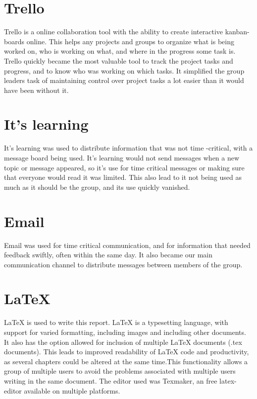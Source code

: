 \section{Trello}  
\label{def:trello} 
Trello is a online collaboration tool with the ability to create interactive kanban-boards online. This helps any projects and groups to organize what is being worked on, who is working on what, and where in the progress some task is. Trello quickly became the most valuable tool to track the project tasks and progress, and to know who was working on which tasks. It simplified the group leaders task of maintaining control over project tasks a lot easier than it would have been without it.

\section{It's learning}
It's learning was used to distribute information that was not time -critical, with a message board being used. It's learning would not send messages when a new topic or message appeared, so it's use for time critical messages or making sure that everyone would read it was limited. This also lead to it not being used as much as it should be the group, and its use quickly vanished.

\section{Email}
Email was used for time critical communication, and for information that needed feedback swiftly, often within the same day. It also became our main communication channel to distribute messages between members of the group.

\section{LaTeX}
LaTeX is used to write this report. LaTeX is a typesetting language, with support for varied formatting, including images and including other documents. It also has the option allowed for inclusion of multiple LaTeX documents (.tex documents). This leads to improved readability of LaTeX code and productivity, as several chapters could be altered at the same time.This functionality allows a group of multiple users to avoid the problems associated with multiple users writing in the same document. The editor used was Texmaker, an free latex-editor available on multiple platforms.

